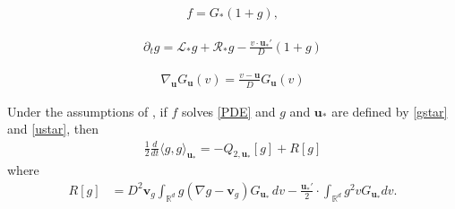 \documentclass[10pt,a4paper]{amsart}
\begin{document}
\begin{align}
\label{gstar}
    f=G_{*}(1+g),
\end{align}

     \begin{align}
     \label{evoldegstar}
         \partial_tg=\mathcal{L}_{*}g+\mathcal{R}_{*}g-\frac{v\cdot \mathbf{u}_*'}{D}(1+g)
     \end{align}

    \begin{align}
     \label{nalblau}
         \nabla_{\mathbf{u}}G_{\mathbf{u}}(v)=\frac{v-\mathbf{u}}{D}G_{\mathbf{u}}(v)
     \end{align}

 \begin{lemma}
\label{deriveps}
 Under the assumptions of , if $f$ solves \eqref{PDE} and $g$ and $\mathbf{u}_*$ are defined by \eqref{gstar} and \eqref{ustar}, then 
    \begin{align}
        \frac{1}{2}\frac{d}{dt}\langle g,g\rangle _{\mathbf{u}_*}= -Q_{2,\mathbf{u}_*}[g]+ R[g]
    \end{align}
where 
\begin{align}
\label{expressiondeR}
    R[g]&=D^2 \mathbf{v}_g  \int_{\mathbb{R}^d}g(\nabla g- \mathbf{v}_g)G_{\mathbf{u}_*}\, dv -\frac{\mathbf{u}_*'}{2}\cdot \int_{\mathbb{R}^d}g^2vG_{\mathbf{u}_*}dv.
\end{align}
\end{lemma}
\end{document}

